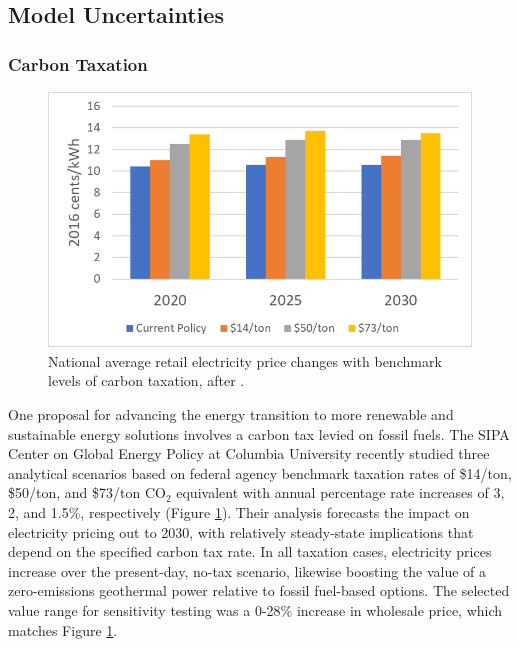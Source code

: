 \subsection{Model Uncertainties}\label{ch4:model_uncertainties}
\subsubsection{Carbon Taxation}\label{ch4:carbon_tax_uncertainty}
\begin{figure}
\centering
\includegraphics[scale=0.6]{templates/images/Figure-Carbon_Tax_Price_Impact.png}
\singlespacing
\caption[Carbon tax price impact]{National average retail electricity price changes with benchmark levels of carbon taxation, after \protect\citep[Figure\ 30]{larson_energy_2018}.}
\label{fig:carbon_tax_pricing}
\end{figure}
One proposal for advancing the energy transition to more renewable and sustainable energy solutions involves a carbon tax levied on fossil fuels. The SIPA Center on Global Energy Policy at Columbia University recently studied three analytical scenarios based on federal agency benchmark taxation rates of \$14/ton, \$50/ton, and \$73/ton CO$_2$ equivalent with annual percentage rate increases of 3, 2, and 1.5\%, respectively \citep{larson_energy_2018} (Figure \ref{fig:carbon_tax_pricing}). Their analysis forecasts the impact on electricity pricing out to 2030, with relatively steady-state implications that depend on the specified carbon tax rate. In all taxation cases, electricity prices increase over the present-day, no-tax scenario, likewise boosting the value of a zero-emissions geothermal power relative to fossil fuel-based options. The selected value range for sensitivity testing was a 0-28\% increase in wholesale price, which matches Figure \ref{fig:carbon_tax_pricing}.

